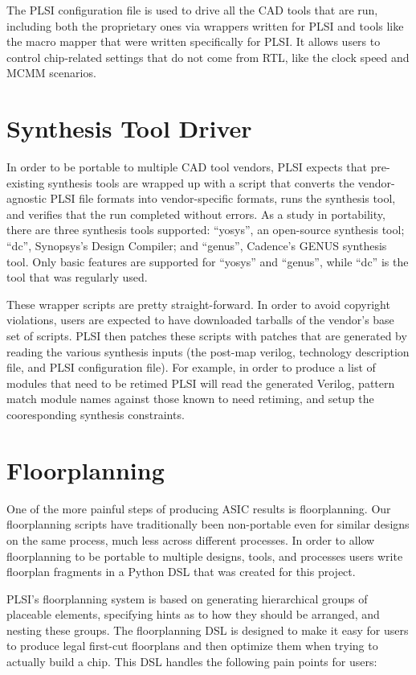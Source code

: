 \documentclass{article}
\begin{document}
The PLSI configuration file is used to drive all the CAD tools that are run,
including both the proprietary ones via wrappers written for PLSI and tools
like the macro mapper that were written specifically for PLSI.  It allows users
to control chip-related settings that do not come from RTL, like the clock
speed and MCMM scenarios.

\section{Synthesis Tool Driver}

In order to be portable to multiple CAD tool vendors, PLSI expects that
pre-existing synthesis tools are wrapped up with a script that converts the
vendor-agnostic PLSI file formats into vendor-specific formats, runs the
synthesis tool, and verifies that the run completed without errors.  As a study
in portability, there are three synthesis tools supported: ``yosys'', an
open-source synthesis tool; ``dc'', Synopsys's Design Compiler; and ``genus'',
Cadence's GENUS synthesis tool.  Only basic features are supported for ``yosys''
and ``genus'', while ``dc'' is the tool that was regularly used.

These wrapper scripts are pretty straight-forward.  In order to avoid copyright
violations, users are expected to have downloaded tarballs of the vendor's base
set of scripts.  PLSI then patches these scripts with patches that are
generated by reading the various synthesis inputs (the post-map verilog,
technology description file, and PLSI configuration file).  For example, in
order to produce a list of modules that need to be retimed PLSI will read the
generated Verilog, pattern match module names against those known to need
retiming, and setup the cooresponding synthesis constraints.

\section{Floorplanning}

One of the more painful steps of producing ASIC results is floorplanning.  Our
floorplanning scripts have traditionally been non-portable even for similar
designs on the same process, much less across different processes.  In order to
allow floorplanning to be portable to multiple designs, tools, and processes
users write floorplan fragments in a Python DSL that was created for this
project.

PLSI's floorplanning system is based on generating hierarchical groups of
placeable elements, specifying hints as to how they should be arranged, and
nesting these groups.  The floorplanning DSL is designed to make it easy for
users to produce legal first-cut floorplans and then optimize them when trying
to actually build a chip.  This DSL handles the following pain points for users:
\end{document}

